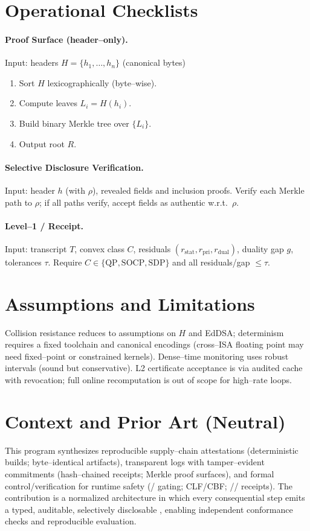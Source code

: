 \documentclass[11pt,a4paper]{article}
\numberwithin{equation}{section}
\theoremstyle{plain}
\theoremstyle{definition}
\theoremstyle{remark}
\begin{document}
\section{Operational Checklists}
\label{sec:checklists}
\paragraph{Proof Surface (header--only).}
Input: headers $H=\{h_1,\dots,h_n\}$ (canonical bytes)
\begin{enumerate}[nosep]
  \item Sort $H$ lexicographically (byte--wise).
  \item Compute leaves $L_i=H(h_i)$.
  \item Build binary Merkle tree over $\{L_i\}$.
  \item Output root $R$.
\end{enumerate}

\paragraph{Selective Disclosure Verification.}
Input: header $h$ (with  $\rho$), revealed fields and inclusion proofs. Verify each Merkle path to $\rho$; if all paths verify, accept fields as authentic w.r.t.\ $\rho$.

\paragraph{Level--1 \dro/\kkt{} Receipt.}
Input: transcript $T$, convex class $C$, residuals $(r_{\text{stat}},r_{\text{pri}},r_{\text{dual}})$, duality gap $g$, tolerances $\tau$. Require $C\in\{\text{QP},\text{SOCP},\text{SDP}\}$ and all residuals/gap $\le \tau$.

\section{Assumptions and Limitations}
\label{sec:limits}
Collision resistance reduces to assumptions on $H$ and EdDSA; determinism requires a fixed toolchain and canonical encodings (cross--ISA floating point may need fixed--point or constrained kernels). Dense--time \stl{} monitoring uses robust intervals (sound but conservative).
L2 certificate acceptance is via audited cache with revocation; full online recomputation is out of scope for high--rate loops.

\section{Context and Prior Art (Neutral)}
\label{sec:context}
This program synthesizes reproducible supply--chain attestations (deterministic builds; byte--identical artifacts), transparent logs with tamper--evident commitments (hash--chained receipts; Merkle proof surfaces), and formal control/verification for runtime safety (\stl/\smt{} gating; CLF/CBF; \kkt/\pr/\iss{} receipts). The contribution is a normalized architecture in which every consequential step emits a typed, auditable, selectively disclosable \receipt{}, enabling independent conformance checks and reproducible evaluation.
\end{document}
